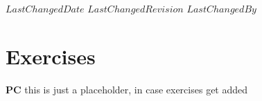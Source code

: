 {$LastChangedDate$}
{$LastChangedRevision$} {$LastChangedBy$}


\chapter{Exercises}
\label{sect:exerFlow}

{\bf PC}{ this is just a placeholder, in case exercises get added}
